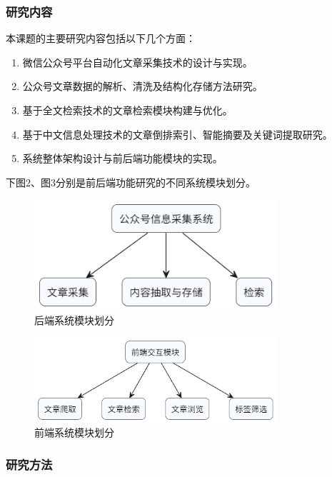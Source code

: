\documentclass[a4paper,12pt]{ctexart}
\newcommand{\wuhao}{\fontsize{10.5pt}{15.75pt}\selectfont} %
\begin{document}
\subsubsection{研究内容}
\songti\wuhao
本课题的主要研究内容包括以下几个方面：

\begin{enumerate}[label=\roman*., leftmargin=2em, itemsep=0pt, parsep=0pt]
\item 微信公众号平台自动化文章采集技术的设计与实现。
\item 公众号文章数据的解析、清洗及结构化存储方法研究。
\item 基于全文检索技术的文章检索模块构建与优化。
\item 基于中文信息处理技术的文章倒排索引、智能摘要及关键词提取研究。
\item 系统整体架构设计与前后端功能模块的实现。
\end{enumerate}

下图2、图3分别是前后端功能研究的不同系统模块划分。

\begin{figure}[htbp]
    \centering
    \includegraphics[width=0.8\textwidth]{图2：后端系统模块.png}
    \caption{后端系统模块划分}
    \label{fig:backend_modules}
\end{figure}

\begin{figure}[htbp]
    \centering
    \includegraphics[width=0.8\textwidth]{图3-前端系统模块划分.png}
    \caption{前端系统模块划分}
    \label{fig:backend_modules}
\end{figure}

\subsubsection{研究方法}
\songti\wuhao
[此处添加研究方法内容]
\end{document}
